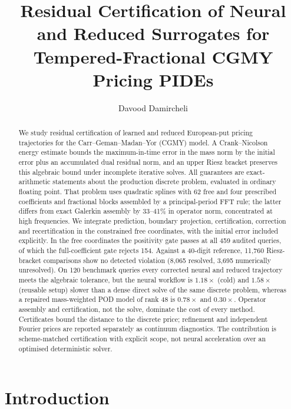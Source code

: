 \documentclass[11pt]{amsart}
\title[Residual Certification for CGMY Pricing Trajectories]
      {Residual Certification of Neural and Reduced Surrogates for\\ Tempered-Fractional CGMY Pricing PIDEs}
\author{Davood Damircheli}
\date{}
\theoremstyle{remark}
\begin{document}
\begin{abstract}
We study residual certification of learned and reduced European-put pricing
trajectories for the Carr--Geman--Madan--Yor (CGMY) model. A Crank--Nicolson
energy estimate bounds the maximum-in-time error in the mass norm by the
initial error plus an accumulated dual residual norm, and an upper Riesz
bracket preserves this algebraic bound under incomplete iterative solves.
All guarantees are exact-arithmetic statements about the production discrete
problem, evaluated in ordinary floating point. That problem uses quadratic
splines with 62 free and four prescribed coefficients and fractional blocks
assembled by a principal-period FFT rule; the latter differs from exact
Galerkin assembly by 33--41\% in operator norm, concentrated at high
frequencies. We integrate prediction, boundary projection, certification,
correction and recertification in the constrained free coordinates, with the
initial error included explicitly. In the free coordinates the positivity gate
passes at all 459 audited queries, of which the full-coefficient gate rejects 154.
Against a 40-digit reference, 11{,}760 Riesz-bracket comparisons show no
detected violation (8{,}065 resolved, 3{,}695 numerically unresolved). On 120
benchmark queries every corrected neural and reduced trajectory meets the
algebraic tolerance, but the neural workflow is $1.18\times$ (cold) and
$1.58\times$ (reusable setup) slower than a dense direct solve of the same
discrete problem, whereas a repaired mass-weighted POD model of rank 48 is
$0.78\times$ and $0.30\times$. Operator assembly and certification, not the
solve, dominate the cost of every method. Certificates bound the distance to the discrete
price; refinement and independent Fourier prices are reported separately as
continuum diagnostics. The contribution is scheme-matched certification with
explicit scope, not neural acceleration over an optimised deterministic solver.
\end{abstract}

\maketitle

\section{Introduction}
\label{sec:introduction}
\end{document}
